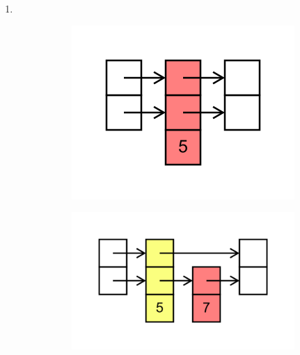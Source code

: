\documentclass[11pt,a4paper]{article}
\begin{document}
\begin{loesung}
    \begin{enumerate}
        \item \ \\
        \begin{figure}[h!]
            \centering
            \begin{subfigure}[b]{0.3\textwidth}
                \centering
                \includegraphics[scale=0.15]{img/2a/1}
            \end{subfigure}
            \begin{subfigure}[b]{0.3\textwidth}
                \centering
                \includegraphics[scale=0.15]{img/2a/2}
            \end{subfigure}
            \begin{subfigure}[b]{0.3\textwidth}

\end{subfigure}
\end{figure}
\end{enumerate}
\end{loesung}
\end{document}
